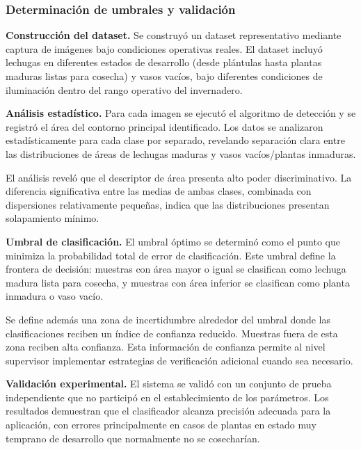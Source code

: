 \subsubsection{Determinación de umbrales y validación}

\textbf{Construcción del dataset.} Se construyó un dataset representativo mediante captura de imágenes bajo condiciones operativas reales. El dataset incluyó lechugas en diferentes estados de desarrollo (desde plántulas hasta plantas maduras listas para cosecha) y vasos vacíos, bajo diferentes condiciones de iluminación dentro del rango operativo del invernadero.

\textbf{Análisis estadístico.} Para cada imagen se ejecutó el algoritmo de detección y se registró el área del contorno principal identificado. Los datos se analizaron estadísticamente para cada clase por separado, revelando separación clara entre las distribuciones de áreas de lechugas maduras y vasos vacíos/plantas inmaduras.

El análisis reveló que el descriptor de área presenta alto poder discriminativo. La diferencia significativa entre las medias de ambas clases, combinada con dispersiones relativamente pequeñas, indica que las distribuciones presentan solapamiento mínimo.

\textbf{Umbral de clasificación.} El umbral óptimo se determinó como el punto que minimiza la probabilidad total de error de clasificación. Este umbral define la frontera de decisión: muestras con área mayor o igual se clasifican como lechuga madura lista para cosecha, y muestras con área inferior se clasifican como planta inmadura o vaso vacío.

Se define además una zona de incertidumbre alrededor del umbral donde las clasificaciones reciben un índice de confianza reducido. Muestras fuera de esta zona reciben alta confianza. Esta información de confianza permite al nivel supervisor implementar estrategias de verificación adicional cuando sea necesario.

\textbf{Validación experimental.} El sistema se validó con un conjunto de prueba independiente que no participó en el establecimiento de los parámetros. Los resultados demuestran que el clasificador alcanza precisión adecuada para la aplicación, con errores principalmente en casos de plantas en estado muy temprano de desarrollo que normalmente no se cosecharían.
